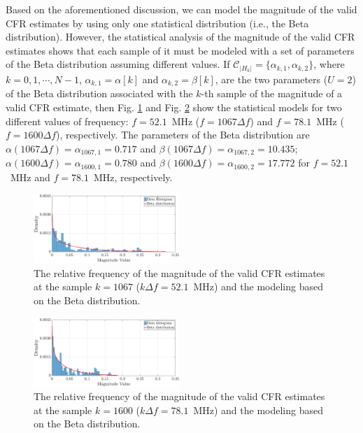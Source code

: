 \documentclass[journal]{IEEEtran}
\begin{document}
Based on the aforementioned discussion, we can model the magnitude of the valid \ac{CFR} estimates by using only one statistical distribution (i.e., the Beta distribution). However, the statistical analysis of the magnitude of the valid \ac{CFR} estimates shows that each sample of it must be modeled with a set of parameters of the Beta distribution assuming different values. If $\mathcal{C}_{|H_k|} = \{\alpha_{k,1},\alpha_{k,2}\}$, where $k=0,1,\cdots,N-1$,  $\alpha_{k,1} = \alpha[k]$ and $\alpha_{k,2} = \beta[k]$, are the two parameters ($U=2$) of the Beta distribution associated with the $k$-th sample of the magnitude of a valid \ac{CFR} estimate, then Fig. \ref{mag_example} and Fig. \ref{mag_example2} show the statistical models for two different values of frequency: $f=52.1$~MHz ($f = 1067\Delta f$) and $f=78.1$~MHz ($f = 1600\Delta f$), respectively. The parameters of the Beta distribution are  $\alpha(1067 \Delta f) = \alpha_{1067,1}=0.717$ and $\beta( 1067 \Delta f) = \alpha_{1067,2} = 10.435$; $\alpha(1600 \Delta f) = \alpha_{1600,1} = 0.780$ and $\beta( 1600 \Delta f) = \alpha_{1600,2}=17.772$ for $f=52.1$~MHz and $f=78.1$~MHz, respectively.

\begin{figure}[h!]
	\centering
	\includegraphics[width=0.49\textwidth]{images/Mag_hist_2.eps}
	\caption{The relative frequency of the magnitude of the valid \ac{CFR} estimates at the sample $k = 1067$ ($k\Delta f= 52.1$~MHz) and the modeling based on the Beta distribution.}
	\label{mag_example}
\end{figure}

\begin{figure}[h!]
	\centering
	\includegraphics[width=0.49\textwidth]{images/Mag_hist2_2.eps}
	\caption{The relative frequency of the magnitude of the valid \ac{CFR} estimates at the sample $k = 1600$ ($k\Delta f= 78.1$~MHz) and the modeling based on the Beta distribution.}
	\label{mag_example2}
\end{figure}
\end{document}
